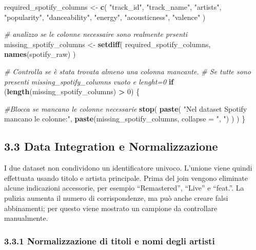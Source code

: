 \documentclass[
]{article}
\newenvironment{Shaded}{\begin{snugshade}}{\end{snugshade}}
\newcommand{\AttributeTok}[1]{\textcolor[rgb]{0.13,0.29,0.53}{#1}}
\newcommand{\CommentTok}[1]{\textcolor[rgb]{0.56,0.35,0.01}{\textit{#1}}}
\newcommand{\ControlFlowTok}[1]{\textcolor[rgb]{0.13,0.29,0.53}{\textbf{#1}}}
\newcommand{\DecValTok}[1]{\textcolor[rgb]{0.00,0.00,0.81}{#1}}
\newcommand{\FunctionTok}[1]{\textcolor[rgb]{0.13,0.29,0.53}{\textbf{#1}}}
\newcommand{\NormalTok}[1]{#1}
\newcommand{\OtherTok}[1]{\textcolor[rgb]{0.56,0.35,0.01}{#1}}
\newcommand{\SpecialCharTok}[1]{\textcolor[rgb]{0.81,0.36,0.00}{\textbf{#1}}}
\newcommand{\StringTok}[1]{\textcolor[rgb]{0.31,0.60,0.02}{#1}}
\begin{document}
\begin{Shaded}
\begin{Highlighting}[]
\NormalTok{  required\_spotify\_columns }\OtherTok{\textless{}{-}} \FunctionTok{c}\NormalTok{(}
    \StringTok{"track\_id"}\NormalTok{,}
    \StringTok{"track\_name"}\NormalTok{,}
    \StringTok{"artists"}\NormalTok{,}
    \StringTok{"popularity"}\NormalTok{,}
    \StringTok{"danceability"}\NormalTok{,}
    \StringTok{"energy"}\NormalTok{,}
    \StringTok{"acousticness"}\NormalTok{,}
    \StringTok{"valence"}
\NormalTok{  )}
  
  \CommentTok{\# analizzo se le colonne necessaire sono realmente prsenti}
\NormalTok{  missing\_spotify\_columns }\OtherTok{\textless{}{-}} \FunctionTok{setdiff}\NormalTok{(}
\NormalTok{    required\_spotify\_columns,}
    \FunctionTok{names}\NormalTok{(spotify\_raw)}
\NormalTok{  )}
  
  \CommentTok{\# Controlla se è stata trovata almeno una colonna mancante.}
  \CommentTok{\# Se tutte sono presenti missing\_spotify\_columns vuoto e lenght=0}
  \ControlFlowTok{if}\NormalTok{ (}\FunctionTok{length}\NormalTok{(missing\_spotify\_columns) }\SpecialCharTok{\textgreater{}} \DecValTok{0}\NormalTok{) \{}
  
  \CommentTok{\#Blocca se mancano le colonne necessarie}
    \FunctionTok{stop}\NormalTok{(}
      \FunctionTok{paste}\NormalTok{(}
        \StringTok{"Nel dataset Spotify mancano le colonne:"}\NormalTok{,}
        \FunctionTok{paste}\NormalTok{(missing\_spotify\_columns, }\AttributeTok{collapse =} \StringTok{", "}\NormalTok{)}
\NormalTok{      )}
\NormalTok{    )}
\NormalTok{  \}}
\end{Highlighting}
\end{Shaded}

\subsection{3.3 Data Integration e
Normalizzazione}\label{data-integration-e-normalizzazione}

I due dataset non condividono un identificatore univoco. L'unione viene
quindi effettuata usando titolo e artista principale. Prima del join
vengono eliminate alcune indicazioni accessorie, per esempio
``Remastered'', ``Live'' e ``feat.''. La pulizia aumenta il numero di
corrispondenze, ma può anche creare falsi abbinamenti; per questo viene
mostrato un campione da controllare manualmente.

\subsubsection{3.3.1 Normalizzazione di titoli e nomi degli
artisti}\label{normalizzazione-di-titoli-e-nomi-degli-artisti}
\end{document}
